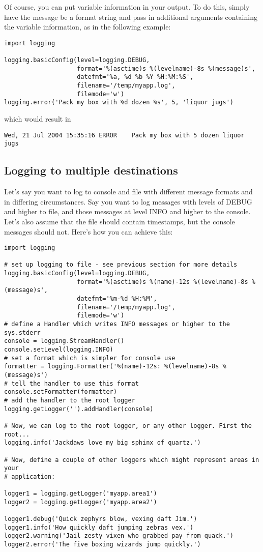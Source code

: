 Of course, you can put variable information in your output. To do this,
simply have the message be a format string and pass in additional arguments
containing the variable information, as in the following example:

\begin{verbatim}
import logging

logging.basicConfig(level=logging.DEBUG,
                    format='%(asctime)s %(levelname)-8s %(message)s',
                    datefmt='%a, %d %b %Y %H:%M:%S',
                    filename='/temp/myapp.log',
                    filemode='w')
logging.error('Pack my box with %d dozen %s', 5, 'liquor jugs')
\end{verbatim}

which would result in

\begin{verbatim}
Wed, 21 Jul 2004 15:35:16 ERROR    Pack my box with 5 dozen liquor jugs
\end{verbatim}

\subsection{Logging to multiple destinations \label{multiple-destinations}}

Let's say you want to log to console and file with different message formats
and in differing circumstances. Say you want to log messages with levels
of DEBUG and higher to file, and those messages at level INFO and higher to
the console. Let's also assume that the file should contain timestamps, but
the console messages should not. Here's how you can achieve this:

\begin{verbatim}
import logging

# set up logging to file - see previous section for more details
logging.basicConfig(level=logging.DEBUG,
                    format='%(asctime)s %(name)-12s %(levelname)-8s %(message)s',
                    datefmt='%m-%d %H:%M',
                    filename='/temp/myapp.log',
                    filemode='w')
# define a Handler which writes INFO messages or higher to the sys.stderr
console = logging.StreamHandler()
console.setLevel(logging.INFO)
# set a format which is simpler for console use
formatter = logging.Formatter('%(name)-12s: %(levelname)-8s %(message)s')
# tell the handler to use this format
console.setFormatter(formatter)
# add the handler to the root logger
logging.getLogger('').addHandler(console)

# Now, we can log to the root logger, or any other logger. First the root...
logging.info('Jackdaws love my big sphinx of quartz.')

# Now, define a couple of other loggers which might represent areas in your
# application:

logger1 = logging.getLogger('myapp.area1')
logger2 = logging.getLogger('myapp.area2')

logger1.debug('Quick zephyrs blow, vexing daft Jim.')
logger1.info('How quickly daft jumping zebras vex.')
logger2.warning('Jail zesty vixen who grabbed pay from quack.')
logger2.error('The five boxing wizards jump quickly.')
\end{verbatim}

